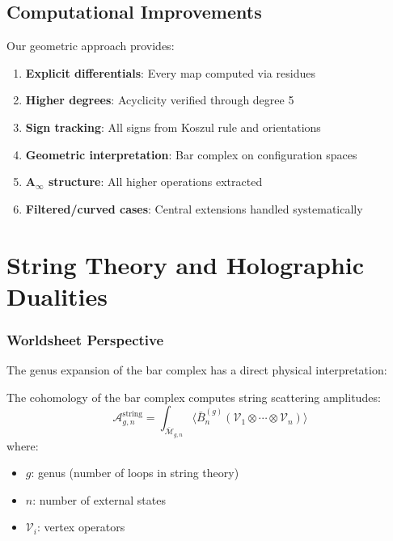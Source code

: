 \subsection{Computational Improvements}
 
Our geometric approach provides:
\begin{enumerate}
\item \textbf{Explicit differentials}: Every map computed via residues
\item \textbf{Higher degrees}: Acyclicity verified through degree 5
\item \textbf{Sign tracking}: All signs from Koszul rule and orientations
\item \textbf{Geometric interpretation}: Bar complex on configuration spaces
\item \textbf{A$_\infty$ structure}: All higher operations extracted
\item \textbf{Filtered/curved cases}: Central extensions handled systematically
\end{enumerate}



\section{String Theory and Holographic Dualities}

\subsubsection{Worldsheet Perspective}

The genus expansion of the bar complex has a direct physical interpretation:

\begin{theorem}
The cohomology of the bar complex computes string scattering amplitudes:
\[
\mathcal{A}_{g,n}^{\text{string}} = \int_{\overline{\mathcal{M}}_{g,n}} \langle \bar{B}^{(g)}_n(\mathcal{V}_1 \otimes \cdots \otimes \mathcal{V}_n) \rangle
\]
where:
\begin{itemize}
\item $g$: genus (number of loops in string theory)
\item $n$: number of external states
\item $\mathcal{V}_i$: vertex operators
\end{itemize}
\end{theorem}

